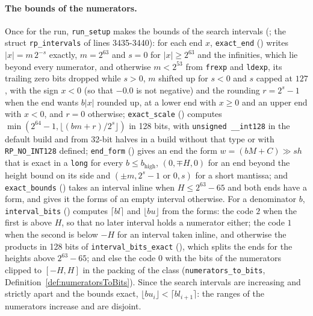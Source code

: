 \paragraph{The bounds of the numerators.} Once for the run, \verb|run_setup| makes the bounds of the
search intervals (; the struct \verb|rp_intervals| of lines
3435-3440): for each end $x$, \verb|exact_end| () writes
$|x| = m\,2^{-s}$ exactly, $m = 2^{63}$ and $s = 0$ for $|x| \ge 2^{63}$ and the infinities, which
lie beyond every numerator, and otherwise $m < 2^{53}$ from \verb|frexp| and \verb|ldexp|, its
trailing zero bits dropped while $s > 0$, $m$ shifted up for $s < 0$ and $s$ capped at $127$, with
the sign $x < 0$ (so that $-0.0$ is not negative) and the rounding $r = 2^s - 1$ when the end wants
$b|x|$ rounded up, at a lower end with $x \ge 0$ and an upper end with $x < 0$, and $r = 0$
otherwise; \verb|exact_scale| () computes
$\min(2^{64} - 1, \lfloor (b m + r)/2^s \rfloor)$ in 128 bits, with \verb|unsigned __int128| in the
default build and from 32-bit halves in a build without that type or with \verb|RP_NO_INT128|
defined; \verb|end_form| () gives an end the form
$w = (b M + C) \gg \mathit{sh}$ that is exact in a \verb|long| for every $b \le b_{\mathrm{high}}$,
$(0, \mp H, 0)$ for an end beyond the height bound on its side and
$(\pm m, 2^s - 1 \text{ or } 0, s)$ for a short mantissa; and \verb|exact_bounds|
() takes an interval inline when $H \le 2^{63} - 65$ and both
ends have a form, and gives it the forms of an empty interval otherwise. For a denominator $b$,
\verb|interval_bits| () computes $\lceil b l \rceil$ and
$\lfloor b u \rfloor$ from the forms: the code $2$ when the first is above $H$, so that no later
interval holds a numerator either; the code $1$ when the second is below $-H$ for an interval taken
inline, and otherwise the products in 128 bits of \verb|interval_bits_exact|
(), which splits the ends for the heights above $2^{63} - 65$;
and else the code $0$ with the bits of the numerators clipped to $[-H, H]$ in the packing of the
class (\verb|numerators_to_bits|, Definition~\ref{def:numeratorsToBits}). Since the search intervals
are increasing and strictly apart and the bounds exact,
$\lfloor b u_i \rfloor < \lceil b l_{i+1} \rceil$: the ranges of the numerators increase and are
disjoint.

